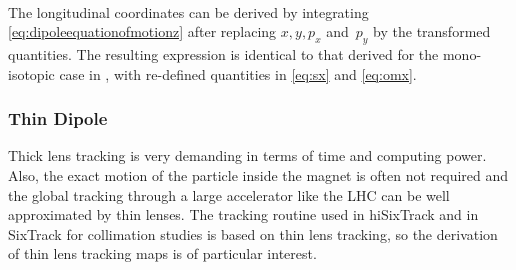 \begin{align}
%
%
\end{align} 

The longitudinal coordinates can be derived by integrating \eqref{eq:dipoleequationofmotionz} after replacing $x,y,p_x$ \mbox{and $p_y$} by the transformed quantities. The resulting expression is identical to that derived for the mono-isotopic case in \cite{SixTrackLibManual}, with re-defined quantities in \eqref{eq:sx} and \eqref{eq:omx}.


\subsubsection{Thin Dipole}
Thick lens tracking is very demanding in terms of time and computing power. Also, the exact motion of the particle inside the magnet is often not required and the global tracking through a large accelerator like the LHC can be well approximated by thin lenses. The tracking routine used in hiSixTrack and in SixTrack for collimation studies is based on thin lens tracking, so the derivation of thin lens tracking maps is of particular interest. 

